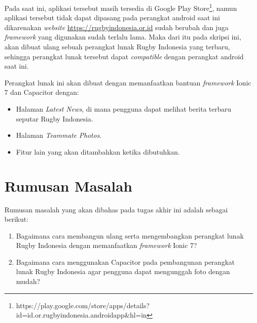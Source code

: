 Pada saat ini, aplikasi tersebut masih tersedia di Google Play Store\footnote{https://play.google.com/store/apps/details?id=id.or.rugbyindonesia.androidapp\&hl=in}, namun aplikasi tersebut tidak dapat dipasang pada perangkat android saat ini dikarenakan \textit{website} \url{https://rugbyindonesia.or.id} sudah berubah dan juga \textit{framework} yang digunakan sudah terlalu lama. Maka dari itu pada skripsi ini, akan dibuat ulang sebuah perangkat lunak Rugby Indonesia yang terbaru, sehingga perangkat lunak tersebut dapat \textit{compatible} dengan perangkat android saat ini.

Perangkat lunak ini akan dibuat dengan memanfaatkan bantuan {\it framework} Ionic 7 dan Capacitor dengan:

\begin{itemize}
    \item Halaman \textit{Latest News}, di mana pengguna dapat melihat berita terbaru seputar Rugby Indonesia.
    \item Halaman \textit{Teammate Photos}.
    \item Fitur lain yang akan ditambahkan ketika dibutuhkan.
\end{itemize}



\section{Rumusan Masalah}
\label{sec:rumusan}
Rumusan masalah yang akan dibahas pada tugas akhir ini adalah sebagai berikut:
\begin{enumerate}
    \item Bagaimana cara membangun ulang serta mengembangkan perangkat lunak Rugby Indonesia dengan memanfaatkan \textit{framework} Ionic 7?
    \item Bagaimana cara menggunakan Capacitor pada pembangunan perangkat lunak Rugby Indonesia agar pengguna dapat mengunggah foto dengan mudah?
\end{enumerate}

